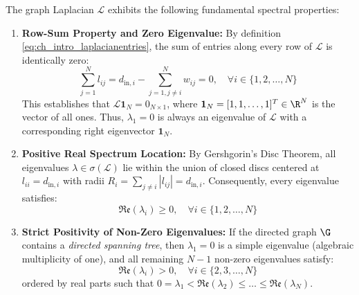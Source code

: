 \begin{remark}\label{prop:ch_intro_laplacianzeroeig}
\leavevmode\par\noindent
The graph Laplacian $\mathcal{L}$ exhibits the following fundamental spectral properties:
\begin{enumerate}
    \item \textbf{Row-Sum Property and Zero Eigenvalue:} By definition \eqref{eq:ch_intro_laplacianentries}, the sum of entries along every row of $\mathcal{L}$ is identically zero:
    \begin{equation}
        \sum_{j=1}^{N} l_{ij} = d_{\text{in}, i} - \sum_{j=1, j \neq i}^{N} w_{ij} = 0, \quad \forall i \in \{1, 2, \dots, N\}
    \end{equation}
    This establishes that $\mathcal{L} \mathbf{1}_N = 0_{N \times 1}$, where $\mathbf{1}_N = [1, 1, \dots, 1]^T \in \R^N$ is the vector of all ones. Thus, $\lambda_1 = 0$ is always an eigenvalue of $\mathcal{L}$ with a corresponding right eigenvector $\mathbf{1}_N$.
    
    \item \textbf{Positive Real Spectrum Location:} By Gershgorin's Disc Theorem, all eigenvalues $\lambda \in \sigma(\mathcal{L})$ lie within the union of closed discs centered at $l_{ii} = d_{\text{in},i}$ with radii $R_i = \sum_{j \neq i} |l_{ij}| = d_{\text{in},i}$. Consequently, every eigenvalue satisfies:
    \begin{equation}
        \mathfrak{Re}(\lambda_i) \ge 0, \quad \forall i \in \{1, 2, \dots, N\}
    \end{equation}
    
    \item \textbf{Strict Positivity of Non-Zero Eigenvalues:} If the directed graph $\G$ contains a \emph{directed spanning tree}, then $\lambda_1 = 0$ is a simple eigenvalue (algebraic multiplicity of one), and all remaining $N-1$ non-zero eigenvalues satisfy:
    \begin{equation}
        \mathfrak{Re}(\lambda_i) > 0, \quad \forall i \in \{2, 3, \dots, N\}
    \end{equation}
    ordered by real parts such that $0 = \lambda_1 < \mathfrak{Re}(\lambda_2) \le \dots \le \mathfrak{Re}(\lambda_N)$.
\end{enumerate}
\end{remark}
